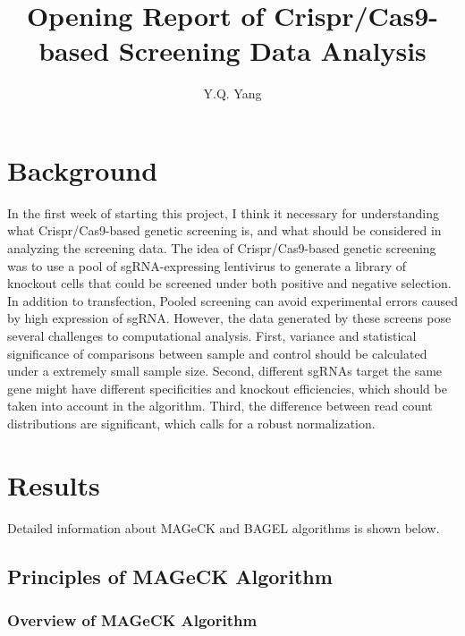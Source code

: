 \documentclass[fleqn,10pt]{wlscirep}
\title{Opening Report of Crispr/Cas9-based Screening Data Analysis}
\author[1]{Y.Q. Yang}
\begin{document}
\flushbottom
\maketitle
%
%
\thispagestyle{empty}


\section*{Background}

In the first week of starting this project, I think it necessary for understanding what Crispr/Cas9-based genetic screening is, and what should be considered in analyzing the screening data.  The idea of Crispr/Cas9-based genetic screening was to use a pool of sgRNA-expressing lentivirus to generate a library of knockout cells that could be screened under both positive and negative selection. \cite{wang2014genetic} In addition to transfection, Pooled screening can avoid experimental errors caused by high expression of sgRNA.
However, the data generated by these screens pose several challenges to computational analysis. First, variance and statistical significance of comparisons between sample and control should be calculated under a extremely small sample size.  Second, different sgRNAs target the same gene might have different specificities and knockout efficiencies, which should be taken into account in the algorithm.  Third, the difference between read count distributions are significant, which calls for a robust normalization. \cite{li2014mageck}

\section*{Results}

Detailed information about MAGeCK and BAGEL algorithms is shown below.

\subsection*{Principles of MAGeCK Algorithm}

\subsubsection*{Overview of MAGeCK Algorithm}
\end{document}
